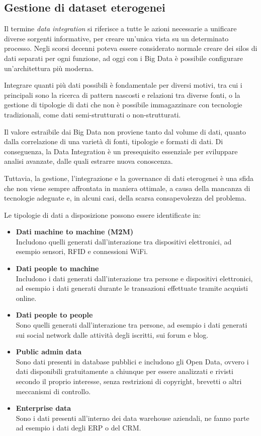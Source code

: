 \subsection{Gestione di dataset eterogenei}
Il termine \textit{data integration} si riferisce a tutte le azioni necessarie a unificare diverse sorgenti informative, per creare un'unica vista su un determinato processo. Negli scorsi decenni poteva essere considerato normale creare dei silos di dati separati per ogni funzione, ad oggi con i Big Data è possibile configurare un'architettura più moderna.

Integrare quanti più dati possibili è fondamentale per diversi motivi, tra cui i principali sono la ricerca di pattern nascosti e relazioni tra diverse fonti, o la gestione di tipologie di dati che non è possibile immagazzinare con tecnologie tradizionali, come dati semi-strutturati o non-strutturati.

Il valore estraibile dai Big Data non proviene tanto dal volume di dati, quanto dalla correlazione di una varietà di fonti, tipologie e formati di dati. Di conseguenza, la Data Integration è un presequisito essenziale per sviluppare analisi avanzate, dalle quali estrarre nuova conoscenza.

Tuttavia, la gestione, l'integrazione e la governance di dati eterogenei è una sfida che non viene sempre affrontata in maniera ottimale, a causa della mancanza di tecnologie adeguate e, in alcuni casi, della scarsa consapevolezza del problema.

Le tipologie di dati a disposizione possono essere identificate in:
\begin{itemize}
    \item \textbf{Dati machine to machine (M2M)}\\
    Includono quelli generati dall'interazione tra dispositivi elettronici, ad esempio sensori, RFID e connessioni WiFi.
    \item \textbf{Dati people to machine}\\
    Includono i dati generati dall'interazione tra persone e dispositivi elettronici, ad esempio i dati generati durante le transazioni effettuate tramite acquisti online.
    \item \textbf{Dati people to people}\\
    Sono quelli generati dall'interazione tra persone, ad esempio i dati generati sui social network dalle attività degli iscritti, sui forum e blog.
    \item \textbf{Public admin data}\\
    Sono dati presenti in database pubblici e includono gli Open Data, ovvero i dati disponibili gratuitamente a chiunque per essere analizzati e rivisti secondo il proprio interesse, senza restrizioni di copyright, brevetti o altri meccanismi di controllo.
    \item \textbf{Enterprise data}\\
    Sono i dati presenti all'interno dei data warehouse aziendali, ne fanno parte ad esempio i dati degli ERP o del CRM.
\end{itemize}

